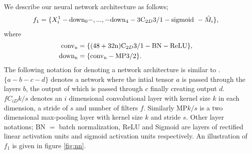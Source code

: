 \documentclass{IET}%
\begin{document}
We describe our neural network architecture as follows;
\begin{align}\label{eq:whaleconv1}
	 f_1 = \{X_i^1 - \text{down\textsubscript{0}} - , ... , - \text{down\textsubscript{4}} - 3\text{C}_{2D}3/1 - \text{sigmoid}\ - \hat{M}_i \}, 
\end{align}
	where 
\begin{align}
			 \text{conv\textsubscript{n}} &= \{(48 + 32\text{n})\text{C}_{2D}3/1 - \text{BN} - \text{ReLU}\}, \\	
     		 \text{down\textsubscript{n}}  &= \{\text{conv\textsubscript{n}}- \text{MP}3/2\}.
     		 \label{eq:whaleconv1block}
\end{align}
The following notation for denoting a network architecture is similar to \cite{graham2014fractional}. $\{a-b-c-d\}$ denotes a network where the intial tensor $a$ is passed through the layers $b$, the output of which is passed through $c$ finally creating output $d$. $fC_{iD}k/s$ denotes an $i$ dimensional convolutional layer with kernel size $k$ in each dimension, a stride of $s$ and number of filters $f$. Similarly MP$k/s$ is a two dimensional max-pooling layer with kernel size $k$ and stride $s$. Other layer notations; BN $=$ batch normalization, ReLU and Sigmoid are layers of rectified linear activation units and sigmoid activation units respectively. An illustration of $f_1$ is given in figure \ref{fig:nn}.
\end{document}
